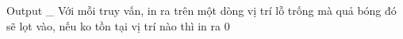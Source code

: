 Output
\_ Với mỗi truy vấn, in ra trên một dòng vị trí lỗ trống mà quả bóng đó sẽ lọt vào, nếu ko tồn tại vị trí nào thì in ra 0